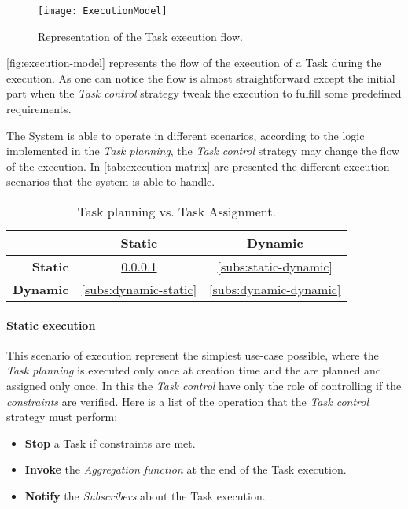 \begin{figure}[htb]
    \centering
    \texttt{[image: ExecutionModel]}
    \caption{Representation of the Task execution flow.}
    \label{fig:execution-model}
\end{figure}
\autoref{fig:execution-model} represents the flow of the execution of a Task
during the execution. As one can notice the flow is almost straightforward except
the initial part when the \emph{Task control} strategy tweak the execution to
fulfill some predefined requirements.

The System is able to operate in different scenarios, according to the logic
implemented in the \emph{Task planning}, the \emph{Task control} strategy may
change the flow of the execution. In \autoref{tab:execution-matrix} are presented
the different execution scenarios that the system is able to handle.
\begin{table}[htb]
	\caption{Task planning vs. Task Assignment.}
	\label{tab:execution-matrix}
	\centering
	\begin{tabular}{r|c|c}
		 & \textbf{Static} & \textbf{Dynamic}\\
		\hline
		\textbf{Static} & \ref{subs:static-static} & \ref{subs:static-dynamic}\\
		\hline
		\textbf{Dynamic} & \ref{subs:dynamic-static} & \ref{subs:dynamic-dynamic}
	\end{tabular}
\end{table}



\paragraph{Static execution}
\label{subs:static-static}
This scenario of execution represent the simplest use-case possible, where the
\emph{Task planning} is executed only once at creation time and the \utask{} are
planned and assigned only once. In this  the \emph{Task control} have
only the role of controlling if the \emph{constraints} are verified. Here is a
list of the operation that the \emph{Task control} strategy must perform:
\begin{itemize}
	\item \textbf{Stop} a Task if constraints are met.
	\item \textbf{Invoke} the \emph{Aggregation function} at the end of the Task
	execution.
	\item \textbf{Notify} the \emph{Subscribers} about the Task execution.
\end{itemize}




